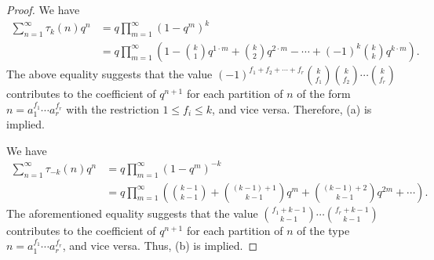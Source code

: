 \documentclass[10pt]{article}
\theoremstyle{definition}
\begin{document}
\begin{proof}
We have 
\begin{align*}
\sum_{n=1}^{\infty}\tau_k(n)q^n&=q\prod_{m=1}^{\infty}(1-q^m)^k\\ 
&=q\prod_{m=1}^{\infty}\left(1-{k\choose 1}q^{1\cdot m}+{k\choose 2}q^{2\cdot m}-\cdots +(-1)^{k}{k\choose k}q^{k\cdot m}\right).
\end{align*}
The above equality suggests that the value $(-1)^{f_1+f_2+\cdots +f_r}{k\choose {f_1}}{k\choose{f_2}}\cdots {k\choose{f_r}}$ contributes to the coefficient of $q^{n+1}$ for each partition of $n$ of the form $n=a_1^{f_1}\cdots a_r^{f_r}$ with the restriction $1\leq f_i\leq k$, and vice versa. Therefore, (a) is implied.

We have
\begin{align*}
\sum_{n=1}^{\infty}\tau_{-k}(n)q^n&=q\prod_{m=1}^{\infty}(1-q^m)^{-k}\\
&=q\prod_{m=1}^{\infty}\left({k-1\choose{k-1}}+{{(k-1)+1}\choose{k-1}}q^m+{(k-1)+2\choose{k-1}}q^{2m}+\cdots\right).
\end{align*}
The aforementioned equality suggests that the value ${{f_1+k-1}\choose{k-1}}\cdots {{f_r+k-1}\choose{k-1}}$ contributes to the coefficient of $q^{n+1}$ for each partition of $n$ of the type $n=a_1^{f_1}\cdots a_r^{f_r}$, and vice versa. Thus, (b) is implied.
\end{proof}
\end{document}
